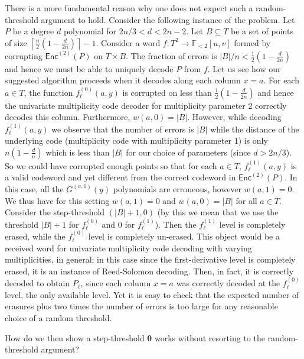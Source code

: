 \documentclass{article}
\def\Field{\mathbb{F}}
\let\F\Field
\newcommand{\enc}{{\mathsf{Enc}}}
\newcommand{\thetabar}{{\boldsymbol{\theta}}}
\begin{document}
	There is a more fundamental reason why one does not expect such a
	random-threshold argument to hold. Consider the following instance of
	the problem. Let $P$ be a degree $d$ polynomial for $2n/3< d <
	2n-2$. Let $B \subseteq T$ be a set of points of size
	$\left\lceil \frac{n}{2}\left(1-\frac{d}{2n}\right)\right\rceil
	-1$. Consider a word $f\colon T^2 \to \F_{<2}[u,v]$ formed by
	corrupting $\enc^{(2)}(P)$ on $T \times B$. The fraction of errors is
	$|B|/n < \frac12\left(1-\frac{d}{2n}\right)$ and hence we must be able
	to uniquely decode $P$ from $f$. Let us see how our suggested
	algorithm proceeds when it decodes along each column $x=a$. For each
	$a \in T$, the function $f_\ell^{(0)}(a,y)$ is corrupted on less than
	$\frac12\left(1-\frac{d}{2n}\right)$ and hence the univariate
	multiplicity code decoder for multiplicity parameter 2 correctly
	decodes this column. Furthermore, $w(a,0) = |B|$. However, while
	decoding $f_\ell^{(1)}(a,y)$ we observe that the number of errors is
	$|B|$ while the distance of the underlying code (multiplicity code
	with multiplicity parameter 1) is only $n\left(1- \frac{d}{n}\right)$
	which is less than $|B|$ for our choice of parameters (since $d > 2n/3$). So we could have
	corrupted enough points so that for each $a\in T$, $f^{(1)}_\ell(a,y)$
	is a valid codeword and yet different from the correct codeword in
	$\enc^{(2)}(P)$. In this case, all the $G^{(a,1)}(y)$ polynomials are
	erroneous, however $w(a,1) = 0$. We thus have for this setting
	$w(a,1) = 0$ and $w(a,0) = |B|$ for all $a \in T$. Consider the
	step-threshold $(|B|+1, 0)$ (by this we mean that we use the threshold
	$|B| + 1$ for $f_{\ell}^{(0)}$ and $0$ for $f_{\ell}^{(1)}$). Then the $f_\ell^{(1)}$ level is completely erased, while the $f_\ell^{(0)}$ level is completely un-erased. This object would be a received word for univariate multiplicity code decoding with varying multiplicities, in general; in this case since the first-derivative level is completely erased, it is an instance of Reed-Solomon decoding. Then, in fact, it is correctly decoded to obtain $P_\ell$, since each column $x=a$ was correctly decoded at the $f_\ell^{(0)}$ level, the only available level. Yet it is easy to check that the expected number of
	erasures plus two times the number of errors is too large for any
	reasonable choice of a random threshold. 
	
	How do we then show a step-threshold $\thetabar$ works without  
	resorting to the random-threshold argument?
	
\end{document}
